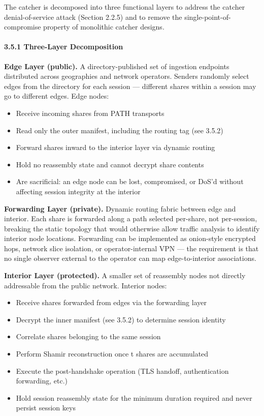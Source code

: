 \documentclass[
  11pt,
]{article}
\providecommand{\tightlist}{%
  \setlength{\itemsep}{0pt}\setlength{\parskip}{0pt}}
\begin{document}
The catcher is decomposed into three functional layers to address the
catcher denial-of-service attack (Section 2.2.5) and to remove the
single-point-of-compromise property of monolithic catcher designs.

\hypertarget{three-layer-decomposition}{%
\paragraph{3.5.1 Three-Layer
Decomposition}\label{three-layer-decomposition}}

\textbf{Edge Layer (public).} A directory-published set of ingestion
endpoints distributed across geographies and network operators. Senders
randomly select edges from the directory for each session --- different
shares within a session may go to different edges. Edge nodes:

\begin{itemize}
\tightlist
\item
  Receive incoming shares from PATH transports
\item
  Read only the outer manifest, including the routing tag (see 3.5.2)
\item
  Forward shares inward to the interior layer via dynamic routing
\item
  Hold no reassembly state and cannot decrypt share contents
\item
  Are sacrificial: an edge node can be lost, compromised, or DoS'd
  without affecting session integrity at the interior
\end{itemize}

\textbf{Forwarding Layer (private).} Dynamic routing fabric between edge
and interior. Each share is forwarded along a path selected per-share,
not per-session, breaking the static topology that would otherwise allow
traffic analysis to identify interior node locations. Forwarding can be
implemented as onion-style encrypted hops, network slice isolation, or
operator-internal VPN --- the requirement is that no single observer
external to the operator can map edge-to-interior associations.

\textbf{Interior Layer (protected).} A smaller set of reassembly nodes
not directly addressable from the public network. Interior nodes:

\begin{itemize}
\tightlist
\item
  Receive shares forwarded from edges via the forwarding layer
\item
  Decrypt the inner manifest (see 3.5.2) to determine session identity
\item
  Correlate shares belonging to the same session
\item
  Perform Shamir reconstruction once t shares are accumulated
\item
  Execute the post-handshake operation (TLS handoff, authentication
  forwarding, etc.)
\item
  Hold session reassembly state for the minimum duration required and
  never persist session keys
\end{itemize}
\end{document}
